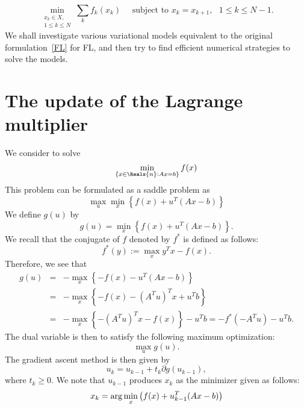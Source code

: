 \begin{itemize}
\begin{equation*}
    \min_{\substack{x_k \in X,\\ 1 \leq k \leq N}} \sum_k f_k (x_k) \quad
    \textrm{ subject to } x_k = x_{k+1}, \textrm{ } 1 \leq k \leq N-1.
\end{equation*}
We shall investigate various variational models equivalent to the original formulation~\cref{FL} for FL, and then try to find efficient numerical strategies to solve the models. 

\section{The update of the Lagrange multiplier} 
We consider to solve
\begin{equation} 
\min_{\{x \in \Reals{n} : Ax = b\}} f(x) 
\end{equation} 
This problem can be formulated as a saddle problem as 
\begin{equation}
\max_u \min_{x} \left \{ f(x) + u^T (Ax - b) \right \}
\end{equation}
We define $g(u)$ by 
\begin{equation} 
g(u) = \min_x \left \{ f(x) + u^T (Ax - b) \right \}. 
\end{equation} 
We recall that the conjugate of $f$ denoted by $f^*$ is defined as follows: 
\begin{equation}
f^*(y) := \max_{x} y^T x - f(x). 
\end{equation}
Therefore, we see that 
\begin{eqnarray*} 
g(u) &=& - \max_x \left \{ -f(x) - u^T (Ax - b)  \right \} \\ 
&=&  - \max_x \left \{ -f(x) - (A^T u)^T x + u^Tb \right \} \\
&=&  - \max_x \left \{ - (A^T u)^T x - f(x) \right \} - u^Tb = - f^*(-A^Tu) - u^Tb. 
\end{eqnarray*} 
The dual variable is then to satisfy the following maximum optimization: 
\begin{equation} 
\max_u g(u). 
\end{equation} 
The gradient ascent method is then given by 
\begin{equation} 
u_k = u_{k-1} + t_k \partial g(u_{k-1}), 
\end{equation} 
where $t_k \geq 0$. We note that $u_{k-1}$ produces $x_k$ as the minimizer given as follows: 
\begin{equation} 
x_k = {\rm arg}\min_x \left ( f(x) + u_{k-1}^T (Ax - b)\right ) 
\end{equation} 

\end{itemize}
